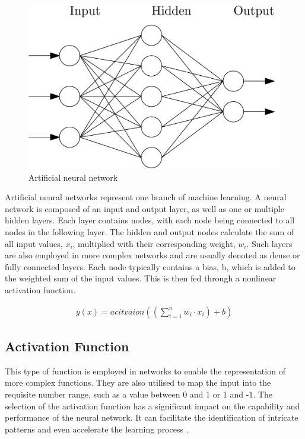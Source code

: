 \documentclass[
a4paper, 
12pt,
grayscalebody, %
abstract=on,
twoside, BCOR10mm, 12pt, DIV13,headinclude, footexclude, final, abstracton, openright
]{ibireprt}
\numberwithin{equation}{chapter}
\numberwithin{table}{chapter}
\numberwithin{figure}{chapter}
\numberwithin{algorithm}{chapter}
\numberwithin{example}{chapter}
\numberwithin{example}{chapter}
\begin{document}
\begin{figure}[h]
	\centering
	\includegraphics[width =0.4 \textwidth]{ANN_network.png}%
	\caption{Artificial neural network}
	\label{fig:ANN_network}
\end{figure}

Artificial neural networks represent one branch of machine learning. A neural network is composed of an input and output layer, as well as one or multiple hidden layers. Each layer contains nodes, with each node being connected to all nodes in the following layer. The hidden and output nodes calculate the sum of all input values, $x_i$, multiplied with their corresponding weight, $w_i$. Such layers are also employed in more complex networks and are usually denoted as dense or fully connected layers. Each node typically contains a bias, b, which is added to the weighted sum of the input values. This is then fed through a nonlinear activation function. 


\begin{align}
	y(x)=acitvaion((\sum_{i=1}^{n}w_i\cdot x_i)+b)
\end{align}



\subsection{Activation Function}
This type of function is employed in networks to enable the representation of more complex functions. They are also utilised to map the input into the requisite number range, such as a value between 0 and 1 or 1 and -1. The selection of the activation function has a significant impact on the capability and performance of the neural network. It can facilitate the identification of intricate patterns and even accelerate the learning process \citep{Khan2020}.  
\end{document}
